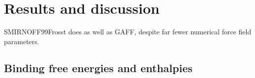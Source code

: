 \documentclass[9pt,lineno]{elife}
\begin{document}


\section{Results and discussion}
SMIRNOFF99Frosst does as well as GAFF, despite far fewer numerical force field parameters.

\subsection{Binding free energies and enthalpies}
\end{document}
